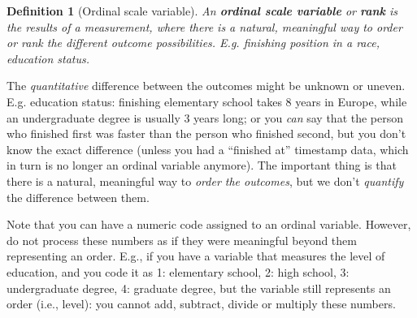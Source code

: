 \documentclass[
  11pt,
]{book}
\theoremstyle{indenteddefinition}
\newtheorem{definition}{Definition}[chapter]
\theoremstyle{indenteddefinition}
\theoremstyle{definition}
\theoremstyle{definition}
\theoremstyle{remark}
\begin{document}
\begin{definition}[Ordinal scale variable]
\protect\hypertarget{def:defordinal}{}\label{def:defordinal}An \textbf{ordinal scale variable} or \textbf{rank} is the results of a measurement, where there is a natural, meaningful way to order or rank the different outcome possibilities. E.g. finishing position in a race, education status.
\end{definition}

The \emph{quantitative} difference between the outcomes might be unknown or uneven. E.g. education status: finishing elementary school takes 8 years in Europe, while an undergraduate degree is usually 3 years long; or you \emph{can} say that the person who finished first was faster than the person who finished second, but you don't know the exact difference (unless you had a ``finished at'' timestamp data, which in turn is no longer an ordinal variable anymore). The important thing is that there is a natural, meaningful way to \emph{order the outcomes}, but we don't \emph{quantify} the difference between them.

Note that you can have a numeric code assigned to an ordinal variable. However, do not process these numbers as if they were meaningful beyond them representing an order. E.g., if you have a variable that measures the level of education, and you code it as 1: elementary school, 2: high school, 3: undergraduate degree, 4: graduate degree, but the variable still represents an order (i.e., level): you cannot add, subtract, divide or multiply these numbers.
\end{document}
